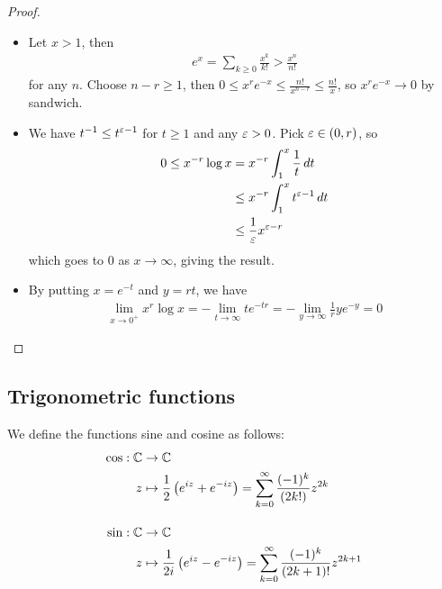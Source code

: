 \documentclass{../template/note}
\begin{document}
    \begin{proof}
        \begin{itemize}
            \item Let \(x > 1\), then
            \begin{align*}
                e^x = \sum_{k\geq 0} \frac{x^k}{k!} > \frac{x^n}{n!}
            \end{align*}
            for any \(n\). Choose \(n-r \geq 1\), then \(0 \leq x^r e^{-x} \leq \frac{n!}{x^{n-r}} \leq \frac{n!}{x}\), so \(x^r e^{-x} \to 0\) by sandwich.         
            \item We have \(t^{-1} \leq t^{\varepsilon-1}\) for \(t \geq 1\) and any \(\varepsilon > 0\). Pick \(\varepsilon \in (0, r)\), so
            \begin{align*}
                0 \leq x^{-r} \log x &= x^{-r} \int_1^x \frac 1 t \,d{t}  
                \\
                &\leq x^{-r} \int_1^x t^{\varepsilon-1} \,d{t} \\
                &\leq \frac 1 {\varepsilon} x^{\varepsilon-r}
            \end{align*}
            which goes to 0 as \(x \to \infty\), giving the result.
            \item By putting \(x = e^{-t}\) and \(y=rt\), we have
            \begin{align*}
                \lim_{x \to 0^+} x^r \log x = -\lim_{t \to \infty} t e^{-tr} = -\lim_{y \to \infty} \frac 1 r ye^{-y} = 0
            \end{align*}
        \end{itemize}
    \end{proof}


    \subsection{Trigonometric functions}

    \begin{definition}
        We define the functions sine and cosine as follows:
        \begin{align*}
            \cos: \mathbb C &\to \mathbb C \\
            z &\mapsto \frac 1 2 \left(e^{iz}+e^{-iz}\right) = \sum_{k=0}^\infty \frac{(-1)^k}{(2k!)}z^{2k} \\[10pt]
            \sin: \mathbb C &\to \mathbb C \\
            z &\mapsto \frac 1 {2i} \left(e^{iz}-e^{-iz}\right) = \sum_{k=0}^\infty \frac{(-1)^k}{(2k+1)!}z^{2k+1}
        \end{align*}
    \end{definition}
    
\end{document}
